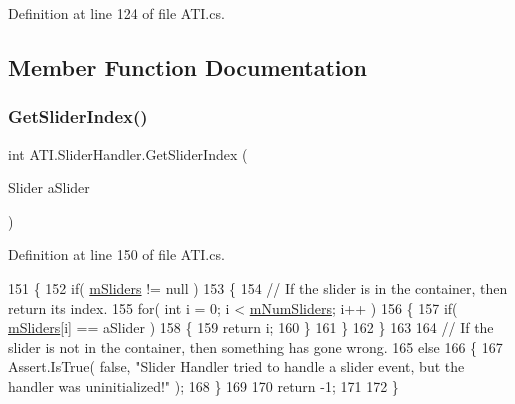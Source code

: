 Definition at line 124 of file A\+T\+I.\+cs.



\subsection{Member Function Documentation}
\mbox{\label{class_a_t_i_1_1_slider_handler_ab6c7a9d82c98d87ebbe45c8a032dbd29}} 
\subsubsection{\texorpdfstring{Get\+Slider\+Index()}{GetSliderIndex()}}
{\footnotesize\ttfamily int A\+T\+I.\+Slider\+Handler.\+Get\+Slider\+Index (\begin{DoxyParamCaption}\item[{Slider}]{a\+Slider }\end{DoxyParamCaption})}



Definition at line 150 of file A\+T\+I.\+cs.


\begin{DoxyCode}
151         \{
152             \textcolor{keywordflow}{if}( \hyperlink{class_a_t_i_1_1_slider_handler_a038a487fbd701cb786e77c210830be76}{mSliders} != null )
153             \{
154                 \textcolor{comment}{// If the slider is in the container, then return its index.}
155                 \textcolor{keywordflow}{for}( \textcolor{keywordtype}{int} i = 0; i < \hyperlink{class_a_t_i_1_1_slider_handler_ac762fad2fb523da79188668dde4488ec}{mNumSliders}; i++ )
156                 \{
157                     \textcolor{keywordflow}{if}( \hyperlink{class_a_t_i_1_1_slider_handler_a038a487fbd701cb786e77c210830be76}{mSliders}[i] == aSlider )
158                     \{
159                         \textcolor{keywordflow}{return} i;
160                     \}
161                 \}
162             \}
163 
164             \textcolor{comment}{// If the slider is not in the container, then something has gone wrong.}
165             \textcolor{keywordflow}{else}
166             \{
167                 Assert.IsTrue( \textcolor{keyword}{false}, \textcolor{stringliteral}{"Slider Handler tried to handle a slider event, but the handler was
       uninitialized!"} );
168             \}
169 
170             \textcolor{keywordflow}{return} -1;
171 
172         \}
\end{DoxyCode}
\mbox{\label{class_a_t_i_1_1_slider_handler_a0ef4eeb2a91b744eaaf2453856aded60}} 
